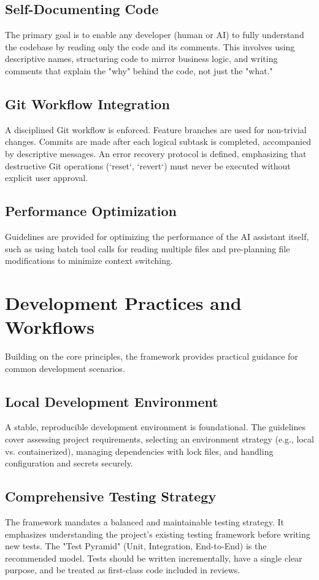 \documentclass[preprint,12pt]{elsarticle}
\begin{document}
\subsection{Self-Documenting Code}
The primary goal is to enable any developer (human or AI) to fully understand the codebase by reading only the code and its comments. This involves using descriptive names, structuring code to mirror business logic, and writing comments that explain the "why" behind the code, not just the "what."

\subsection{Git Workflow Integration}
A disciplined Git workflow is enforced. Feature branches are used for non-trivial changes. Commits are made after each logical subtask is completed, accompanied by descriptive messages. An error recovery protocol is defined, emphasizing that destructive Git operations (`reset`, `revert`) must never be executed without explicit user approval.

\subsection{Performance Optimization}
Guidelines are provided for optimizing the performance of the AI assistant itself, such as using batch tool calls for reading multiple files and pre-planning file modifications to minimize context switching.

\section{Development Practices and Workflows}
Building on the core principles, the framework provides practical guidance for common development scenarios.

\subsection{Local Development Environment}
A stable, reproducible development environment is foundational. The guidelines cover assessing project requirements, selecting an environment strategy (e.g., local vs. containerized), managing dependencies with lock files, and handling configuration and secrets securely.

\subsection{Comprehensive Testing Strategy}
The framework mandates a balanced and maintainable testing strategy. It emphasizes understanding the project's existing testing framework before writing new tests. The "Test Pyramid" (Unit, Integration, End-to-End) is the recommended model. Tests should be written incrementally, have a single clear purpose, and be treated as first-class code included in reviews.
\end{document}
